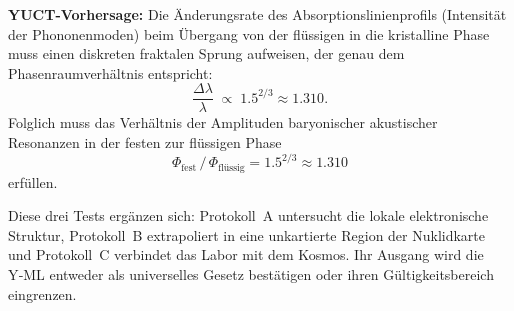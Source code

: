 \documentclass[12pt,a4paper]{article}
\theoremstyle{remark}
\begin{document}
	\textbf{YUCT-Vorhersage:} Die Änderungsrate des Absorptionslinienprofils (Intensität der Phononenmoden) beim Übergang von der flüssigen in die kristalline Phase muss einen diskreten fraktalen Sprung aufweisen, der genau dem Phasenraumverhältnis entspricht:
	\begin{equation}
		\frac{\Delta \lambda}{\lambda} \;\propto\; 1.5^{2/3} \approx 1.310 .
	\end{equation}
	Folglich muss das Verhältnis der Amplituden baryonischer akustischer Resonanzen in der festen zur flüssigen Phase
	\begin{equation}
		\Phi_{\mathrm{fest}} \,/\, \Phi_{\mathrm{flüssig}} = 1.5^{2/3} \approx 1.310
	\end{equation}
	erfüllen.
	
	Diese drei Tests ergänzen sich: Protokoll~A untersucht die lokale elektronische Struktur, Protokoll~B extrapoliert in eine unkartierte Region der Nuklidkarte und Protokoll~C verbindet das Labor mit dem Kosmos. Ihr Ausgang wird die Y‑ML entweder als universelles Gesetz bestätigen oder ihren Gültigkeitsbereich eingrenzen.
	
\end{document}
